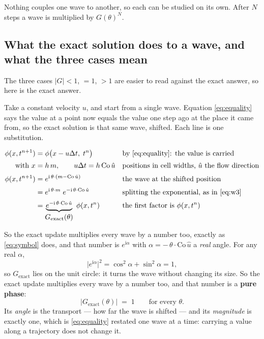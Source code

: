 \documentclass[11pt,a4paper]{article}
\begin{document}
Nothing couples one wave to another, so each can be studied on its own. After \(N\) steps a wave
is multiplied by \(G(\theta)^N\).

\subsection{What the exact solution does to a wave, and what the three cases mean}
\label{sec:exactwave}

The three cases \(|G| < 1\), \(= 1\), \(> 1\) are easier to read against the exact answer, so
here is the exact answer.

Take a constant velocity \(u\), and start from a single wave. Equation \eqref{eq:equality} says
the value at a point now equals the value one step ago at the place it came from, so the exact
solution is that same wave, shifted. Each line is one substitution.

\begin{align}
  \phi(x,t^{n+1}) &= \phi\bigl(x - u\Delta t,\; t^{n}\bigr)
    &&\text{by \eqref{eq:equality}: the value is carried} \\[2pt]
  \text{with } x &= h\,m, \qquad u\Delta t = h\,\mathrm{Co}\,\hat u
    &&\text{positions in cell widths, } \hat u \text{ the flow direction} \\[2pt]
  \phi(x,t^{n+1}) &= e^{\mathrm{i}\,\theta\cdot\left(m - \mathrm{Co}\,\hat u\right)}
    &&\text{the wave at the shifted position} \\[2pt]
  &= e^{\mathrm{i}\,\theta\cdot m}\; e^{-\mathrm{i}\,\theta\cdot \mathrm{Co}\,\hat u}
    &&\text{splitting the exponential, as in \eqref{eq:w3}} \\[2pt]
  &= \underbrace{e^{-\mathrm{i}\,\theta\cdot \mathrm{Co}\,\hat u}}_{\textstyle G_{\text{exact}}(\theta)}
     \;\phi(x,t^{n})
    &&\text{the first factor is } \phi(x,t^{n})
\end{align}

So the exact update multiplies every wave by a number too, exactly as \eqref{eq:symbol} does,
and that number is \(e^{\mathrm{i}\alpha}\) with \(\alpha = -\,\theta\cdot\mathrm{Co}\,\hat u\)
a \emph{real} angle. For any real \(\alpha\),
\begin{equation}
  \bigl|e^{\mathrm{i}\alpha}\bigr|^{2} = \cos^{2}\alpha + \sin^{2}\alpha = 1,
\end{equation}
so \(G_{\text{exact}}\) lies on the unit circle: it turns the wave without changing its size. So the exact update multiplies every wave by a number too,
and that number is a \textbf{pure phase}:
\begin{equation}
  \bigl|G_{\text{exact}}(\theta)\bigr| \;=\; 1 \qquad\text{for every } \theta .
  \label{eq:exactgain}
\end{equation}
Its \emph{angle} is the transport --- how far the wave is shifted --- and its \emph{magnitude}
is exactly one, which is \eqref{eq:equality} restated one wave at a time: carrying a value
along a trajectory does not change it.
\end{document}
